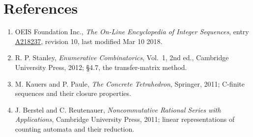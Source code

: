 \documentclass[11pt]{article}
\theoremstyle{definition}
\begin{document}
\section{References}

\begin{enumerate}

\item OEIS Foundation Inc., \emph{The On-Line Encyclopedia of Integer Sequences}, entry \href{https://oeis.org/A218237}{A218237}, revision 10, last modified Mar 10 2018.

\item R. P. Stanley, \emph{Enumerative Combinatorics}, Vol.~1, 2nd ed., Cambridge University Press, 2012; \S4.7, the transfer-matrix method.

\item M. Kauers and P. Paule, \emph{The Concrete Tetrahedron}, Springer, 2011; C-finite sequences and their closure properties.

\item J. Berstel and C. Reutenauer, \emph{Noncommutative Rational Series with Applications}, Cambridge University Press, 2011; linear representations of counting automata and their reduction.

\end{enumerate}
\end{document}
